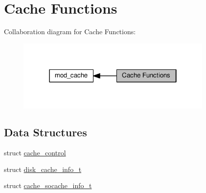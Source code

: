 \hypertarget{group__Cache__cache}{}\section{Cache Functions}
\label{group__Cache__cache}
Collaboration diagram for Cache Functions\+:
\nopagebreak
\begin{figure}[H]
\begin{center}
\leavevmode
\includegraphics[width=274pt]{group__Cache__cache}
\end{center}
\end{figure}
\subsection*{Data Structures}
\begin{DoxyCompactItemize}
\item 
struct \hyperlink{structcache__control}{cache\+\_\+control}
\item 
struct \hyperlink{structdisk__cache__info__t}{disk\+\_\+cache\+\_\+info\+\_\+t}
\item 
struct \hyperlink{structcache__socache__info__t}{cache\+\_\+socache\+\_\+info\+\_\+t}
\end{DoxyCompactItemize}

